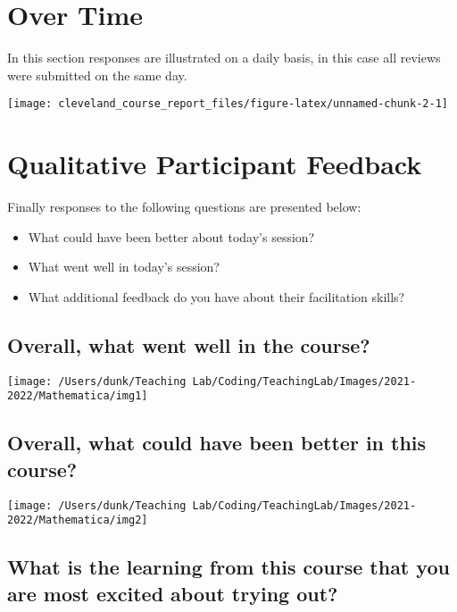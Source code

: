 \documentclass[10,a4paperpaper,]{article}
\begin{document}
\section{Over Time}

In this section responses are illustrated on a daily basis, in this case
all reviews were submitted on the same day.

\begin{center}\texttt{[image: cleveland\_course\_report\_files/figure-latex/unnamed-chunk-2-1]} \end{center}

\section{Qualitative Participant Feedback}

Finally responses to the following questions are presented below:

\begin{itemize}
\item
  What could have been better about today's session?
\item
  What went well in today's session?
\item
  What additional feedback do you have about their facilitation skills?
\end{itemize}

\subsection{Overall, what went well in the course?}

\begin{center}\texttt{[image: /Users/dunk/Teaching Lab/Coding/TeachingLab/Images/2021-2022/Mathematica/img1]} \end{center}

\subsection{Overall, what could have been better in this course?}

\begin{center}\texttt{[image: /Users/dunk/Teaching Lab/Coding/TeachingLab/Images/2021-2022/Mathematica/img2]} \end{center}

\subsection{What is the learning from this course that you are most excited about trying out?}
\end{document}
